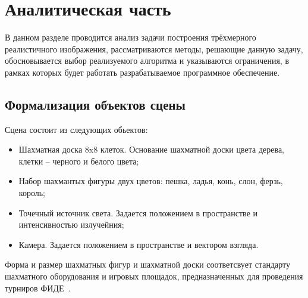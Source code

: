 \chapter{Аналитическая часть}


В данном разделе проводится анализ задачи построения трёхмерного реалистичного изображения, рассматриваются методы, решающие данную задачу, обосновывается выбор реализуемого алгоритма и указываются ограничения, в рамках которых будет работать разрабатываемое программное обеспечение.


\section{Формализация объектов сцены}
Сцена состоит из следующих обьектов:
\begin{itemize}
	\item Шахматная доска 8x8 клеток. Основание шахматной доски цвета дерева, клетки -- черного и белого цвета;
	\item Набор шахмантых фигуры двух цветов: пешка, ладья, конь, слон, ферзь, король;
	\item Точечный источник света. Задается положением в пространстве и интенсивностью излучейния;
	\item Камера. Задается положением в пространстве и вектором взгляда.
\end{itemize}

Форма и размер шахматных фигур и шахматной доски соответсвует стандарту шахматного оборудования и игровых площадок, предназначенных для проведения турниров ФИДЕ~\cite{FIDE2015}.

\clearpage
